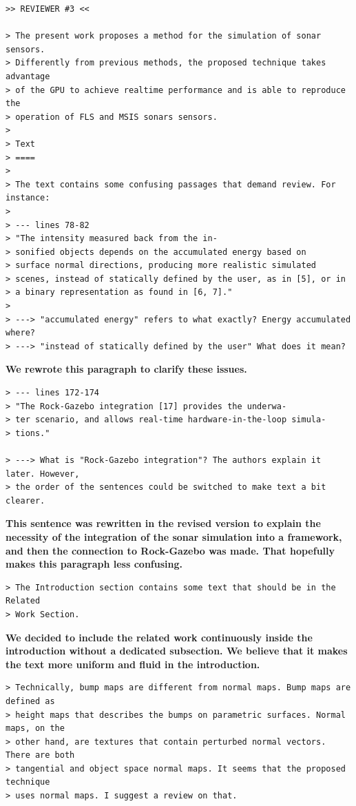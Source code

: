 \documentclass{article}
\begin{document}
\begin{verbatim}
>> REVIEWER #3 <<

> The present work proposes a method for the simulation of sonar sensors.
> Differently from previous methods, the proposed technique takes advantage
> of the GPU to achieve realtime performance and is able to reproduce the
> operation of FLS and MSIS sonars sensors.
>
> Text
> ====
>
> The text contains some confusing passages that demand review. For instance:
>
> --- lines 78-82
> "The intensity measured back from the in-
> sonified objects depends on the accumulated energy based on
> surface normal directions, producing more realistic simulated
> scenes, instead of statically defined by the user, as in [5], or in
> a binary representation as found in [6, 7]."
>
> ---> "accumulated energy" refers to what exactly? Energy accumulated where?
> ---> "instead of statically defined by the user" What does it mean?
\end{verbatim}

\textbf{We rewrote this paragraph to clarify these issues.}

\begin{verbatim}
> --- lines 172-174
> "The Rock-Gazebo integration [17] provides the underwa-
> ter scenario, and allows real-time hardware-in-the-loop simula-
> tions."

> ---> What is "Rock-Gazebo integration"? The authors explain it later. However,
> the order of the sentences could be switched to make text a bit clearer.
\end{verbatim}

\textbf{This sentence was rewritten in the revised version to explain the necessity of the integration of the sonar simulation into a framework, and then the connection to Rock-Gazebo was made. That hopefully makes this paragraph less confusing.}

\begin{verbatim}
> The Introduction section contains some text that should be in the Related
> Work Section.
\end{verbatim}

\textbf{We decided to include the related work continuously inside the introduction without a dedicated subsection. We believe that it makes the text more uniform and fluid in the introduction.}

\begin{verbatim}
> Technically, bump maps are different from normal maps. Bump maps are defined as
> height maps that describes the bumps on parametric surfaces. Normal maps, on the
> other hand, are textures that contain perturbed normal vectors. There are both
> tangential and object space normal maps. It seems that the proposed technique
> uses normal maps. I suggest a review on that.
\end{verbatim}
\end{document}

